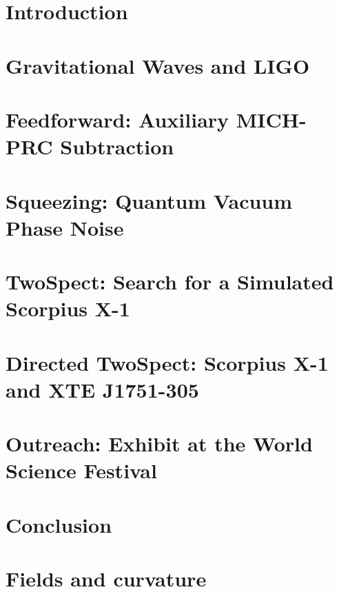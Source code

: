 \documentclass[leqno,twoside]{report}
\theoremstyle{plain}
\theoremstyle{definition}
\theoremstyle{remark}
\numberwithin{theorem}{chapter}        %
\begin{document}


\chapter{Introduction}
\label{intro} 

\chapter{Gravitational Waves and LIGO}
\label{chap2}

\chapter{Feedforward: Auxiliary MICH-PRC Subtraction}
\label{chap3}

\chapter{Squeezing: Quantum Vacuum Phase Noise}
\label{chap4}

\chapter{TwoSpect: Search for a Simulated Scorpius X-1}
\label{chap5}

\chapter{Directed TwoSpect: Scorpius X-1 and XTE J1751-305}
\label{chap6}

\chapter{Outreach: Exhibit at the World Science Festival}
\label{chap7}

\chapter{Conclusion}
\label{conclusion}



\startappendices
\chapter{Fields and curvature}
\label{appendix}

\end{document}
